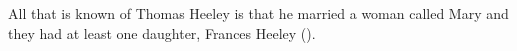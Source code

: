
All that is known of Thomas Heeley is that he married a woman called Mary and they had at least one daughter, Frances Heeley ().
